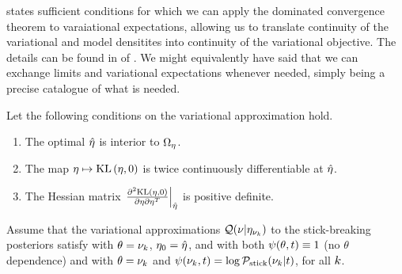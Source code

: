  states sufficient conditions for which we can apply the
dominated convergence theorem to varaiational expectations, allowing us to
translate continuity of the variational and model densitites into continuity of
the variational objective.  The details can be found in  of .  We might equivalently have said that
we can exchange limits and variational expectations whenever needed,
 simply being a precise catalogue of what is needed.


\begin{assu}
%
Let the following conditions on the variational approximation hold.
%
\begin{enumerate}
%
    \item {} The optimal $\hat\eta$ is interior
    to $\Omega_{\eta}$.

    \item {} The map $\eta \mapsto \mathrm{KL}\left(\eta, 0\right)$ is twice
    continuously differentiable at $\hat\eta$.

    \item{} The Hessian matrix $\left.\frac{\partial^2 \mathrm{KL}\left(\eta,
    0\right)}{\partial \eta \partial \eta^T}\right\vert_{\hat\eta}$ is positive definite.
%
\end{enumerate}
%
\end{assu}

\begin{assu}
%
Assume that the variational approximations $\mathcal{Q}(\nu \vert \eta_{\nu_{k}})$ to the
stick-breaking posteriors satisfy  with $\theta = \nu_{k}$,
$\eta_0 = \hat\eta$, and with both $\psi(\theta, t) \equiv 1$ (no $\theta$
dependence) and with $\theta = \nu_{k}$ and $\psi(\nu_{k}, t) = \log \mathcal{P}_{\mathrm{stick}}(\nu_{k}
\vert t)$, for all $k$.
%
\end{assu}

